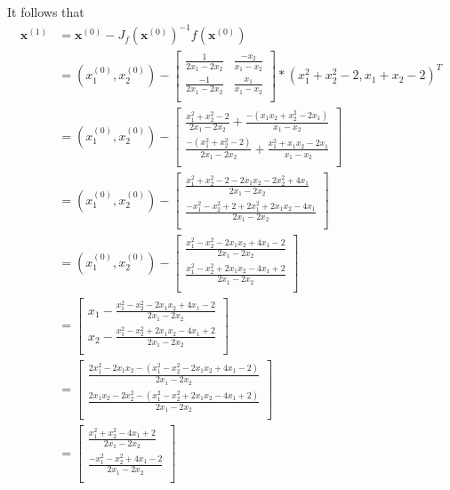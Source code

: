It follows that
\begin{align*}
    \mathbf{x}^{(1)} &= \mathbf{x}^{(0)} - J_f(\mathbf{x}^{(0)})^{-1} f(\mathbf{x}^{(0)}) \\
    &= (x_1^{(0)}, x_2^{(0)}) - \begin{bmatrix}
        \frac{1}{2x_1 - 2x_2} & \frac{-x_2}{x_1 - x_2} \\
        \frac{-1}{2x_1 - 2x_2} & \frac{x_1}{x_1 - x_2} \\
    \end{bmatrix} * (x_1^2 + x_2^2 - 2, x_1 + x_2 - 2)^T \\
    &= (x_1^{(0)}, x_2^{(0)}) - \begin{bmatrix}
        \frac{x_1^2 + x_2^2 - 2}{2x_1 - 2x_2} + \frac{-(x_1x_2 + x_2^2 - 2x_1)}{x_1 - x_2} \\
        \frac{-(x_1^2 + x_2^2 - 2)}{2x_1 - 2x_2} + \frac{x_1^2 + x_1x_2 - 2x_1}{x_1 - x_2} \\
    \end{bmatrix} \\
    &= (x_1^{(0)}, x_2^{(0)}) - \begin{bmatrix}
        \frac{x_1^2 + x_2^2 - 2 - 2x_1x_2 - 2x_2^2 + 4x_1}{2x_1 - 2x_2} \\
        \frac{-x_1^2 - x_2^2 + 2 + 2x_1^2 + 2x_1x_2 - 4x_1}{2x_1 - 2x_2} \\
    \end{bmatrix} \\
    &= (x_1^{(0)}, x_2^{(0)}) - \begin{bmatrix}
        \frac{x_1^2 - x_2^2 - 2x_1x_2 + 4x_1  - 2}{2x_1 - 2x_2} \\
        \frac{x_1^2 - x_2^2 + 2x_1x_2 - 4x_1  + 2}{2x_1 - 2x_2} \\
    \end{bmatrix} \\
    &= \begin{bmatrix}
        x_1 - \frac{x_1^2 - x_2^2 - 2x_1x_2 + 4x_1  - 2}{2x_1 - 2x_2} \\
        x_2 - \frac{x_1^2 - x_2^2 + 2x_1x_2 - 4x_1  + 2}{2x_1 - 2x_2} \\
    \end{bmatrix} \\
    &= \begin{bmatrix}
        \frac{2x_1^2 - 2x_1x_2 - (x_1^2 - x_2^2 - 2x_1x_2 + 4x_1 - 2)}{2x_1 - 2x_2} \\
        \frac{2x_1x_2 - 2x_2^2 - (x_1^2 - x_2^2 + 2x_1x_2 - 4x_1 + 2)}{2x_1 - 2x_2} \\
    \end{bmatrix} \\
    &= \begin{bmatrix}
        \frac{x_1^2 + x_2^2 - 4x_1  + 2}{2x_1 - 2x_2} \\
        \frac{-x_1^2 - x_2^2 + 4x_1  - 2}{2x_1 - 2x_2} \\
    \end{bmatrix} \\
\end{align*}


